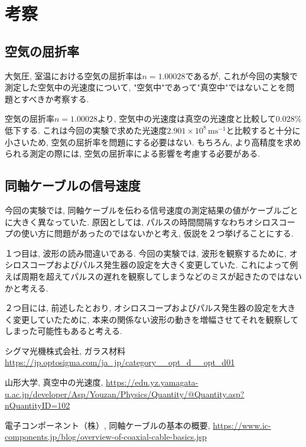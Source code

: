 \documentclass{jarticle}
\begin{document}
\section{考察}


\subsection{空気の屈折率}

大気圧, 室温における空気の屈折率は$n=1.00028$であるが, これが今回の実験で測定した空気中の光速度について, "空気中"であって"真空中"ではないことを問題とすべきか考察する.

空気の屈折率$n=1.00028$より, 空気中の光速度は真空の光速度と比較して0.028\%低下する.
これは今回の実験で求めた光速度$2.901\times10^8\,\mathrm{ms^{-1}}$と比較すると十分に小さいため, 空気の屈折率を問題にする必要はない. もちろん, より高精度を求められる測定の際には, 空気の屈折率による影響を考慮する必要がある.


\subsection{同軸ケーブルの信号速度}

今回の実験では, 同軸ケーブルを伝わる信号速度の測定結果の値がケーブルごとに大きく異なっていた.
原因としては, パルスの時間間隔すなわちオシロスコープの使い方に問題があったのではないかと考え, 仮説を２つ挙げることにする.

１つ目は, 波形の読み間違いである.
今回の実験では, 波形を観察するために, オシロスコープおよびパルス発生器の設定を大きく変更していた.
これによって例えば周期を超えてパルスの遅れを観察してしまうなどのミスが起きたのではないかと考える.

２つ目には, 前述したとおり, オシロスコープおよびパルス発生器の設定を大きく変更していたために, 本来の関係ない波形の動きを増幅させてそれを観察してしまった可能性もあると考える.



\begin{thebibliography}{99}

  シグマ光機株式会社, ガラス材料 \url{https://jp.optosigma.com/ja_jp/category__opt_d__opt_d01}

  山形大学, 真空中の光速度, \url{https://edu.yz.yamagata-u.ac.jp/developer/Asp/Youzan/Physics/Quantity/@Quantity.asp?nQuantityID=102}

  電子コンポーネント（株）, 同軸ケーブルの基本の概要, \url{https://www.ic-components.jp/blog/overview-of-coaxial-cable-basics.jsp}

\end{thebibliography}
\end{document}
